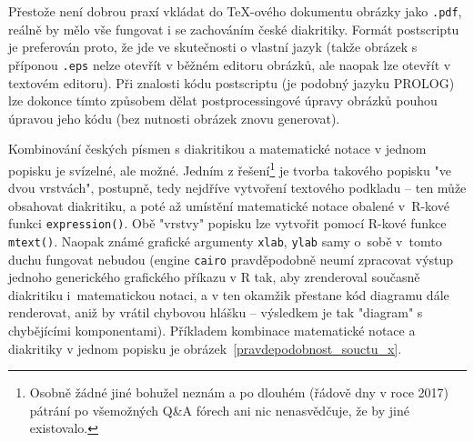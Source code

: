 \documentclass{article}
\begin{document}
Přestože není dobrou praxí vkládat do \TeX-ového dokumentu obrázky
jako \texttt{.pdf}, reálně by mělo vše fungovat i se zachováním
české diakritiky. Formát postscriptu je preferován proto, že jde ve skutečnosti
o vlastní jazyk (takže obrázek s příponou \texttt{.eps} nelze otevřít
v běžném editoru obrázků, ale naopak lze otevřít v textovém editoru).
Při znalosti kódu postscriptu (je podobný jazyku PROLOG)
lze dokonce tímto způsobem dělat postprocessingové
úpravy obrázků pouhou úpravou jeho kódu (bez nutnosti obrázek znovu
generovat).

Kombinování českých písmen s diakritikou a matematické notace v jednom
popisku je svízelné, ale možné. Jedním z řešení\footnote{Osobně žádné jiné
bohužel neznám a po dlouhém (řádově dny v roce 2017) pátrání po všemožných Q\&A fórech
ani nic nenasvědčuje, že by jiné existovalo.} je
tvorba takového popisku "ve dvou vrstvách", postupně, tedy nejdříve vytvoření
textového podkladu -- ten může obsahovat diakritiku, a poté až umístění
matematické notace obalené \mbox{v~\textsf{R}-kové} funkci \texttt{expression()}.
Obě "vrstvy" popisku lze vytvořit pomocí \textsf{R}-kové funkce
\texttt{mtext()}. Naopak známé grafické argumenty \texttt{xlab}, \texttt{ylab}
samy o~sobě v~tomto duchu fungovat nebudou (engine \texttt{cairo} pravděpodobně
neumí zpracovat
výstup jednoho generického grafického příkazu v \textsf{R} tak, aby zrenderoval
současně diakritiku i~matematickou notaci, a v ten okamžik přestane kód diagramu
dále renderovat, aniž by vrátil chybovou hlášku -- výsledkem je tak "diagram"
s chybějícími komponentami). Příkladem kombinace matematické notace a diakritiky
v jednom popisku je obrázek~\ref{pravdepodobnost_souctu_x}.
\end{document}
